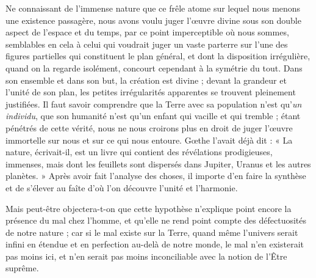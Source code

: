 \documentclass[a4paper, 11pt, oneside]{article}
\begin{document}
Ne connaissant de l'immense nature que ce frêle atome sur lequel nous menons une existence passagère, nous avons voulu juger l'œuvre divine sous son double aspect de l'espace et du temps, par ce point imperceptible où nous sommes, semblables en cela à celui qui voudrait juger un vaste parterre sur l'une des figures partielles qui constituent le plan général, et dont la disposition irrégulière, quand on la regarde isolément, concourt cependant à la symétrie du tout. Dans son ensemble et dans son but, la création est divine ; devant la grandeur et l'unité de son plan, les petites irrégularités apparentes se trouvent pleinement justifiées. Il faut savoir comprendre que la Terre avec sa population n'est qu'\emph{un individu}, que son humanité n'est qu'un enfant qui vacille et qui tremble ; étant pénétrés de cette vérité, nous ne nous croirons plus en droit de juger l'œuvre immortelle sur nous et sur ce qui nous entoure. Gœthe l'avait déjà dit : « La nature, écrivait-il, est un livre qui contient des révélations prodigieuses, immenses, mais dont les feuillets sont dispersés dans Jupiter, Uranus et les autres planètes. » Après avoir fait l'analyse des choses, il importe d'en faire la synthèse et de s'élever au faîte d'où l'on découvre l'unité et l'harmonie.

Mais peut-être objectera-t-on que cette hypothèse n'explique point encore la présence du mal chez l'homme, et qu'elle ne rend point compte des défectuosités de notre nature ; car si le mal existe sur la Terre, quand même l'univers serait infini en étendue et en perfection au-delà de notre monde, le mal n'en existerait pas moins ici, et n'en serait pas moins inconciliable avec la notion de l'Être suprême.
\end{document}
